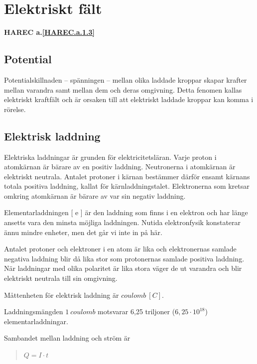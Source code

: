 \section{Elektriskt fält}
\textbf{HAREC a.\ref{HAREC.a.1.3}\label{myHAREC.a.1.3}}
\label{elektriskafält}

\subsection{Potential}

Potentialskillnaden -- spänningen -- mellan olika laddade kroppar skapar
krafter mellan varandra samt mellan dem och deras omgivning.
Detta fenomen kallas elektriskt kraftfält och är orsaken till att elektriskt
laddade kroppar kan komma i rörelse.

\subsection{Elektrisk laddning}

Elektriska laddningar är grunden för elektricitetsläran.
Varje proton i atomkärnan är bärare av en positiv laddning.
Neutronerna i atomkärnan är elektriskt neutrala.
Antalet protoner i kärnan bestämmer därför ensamt kärnans totala positiva
laddning, kallat för kärnladdningstalet.
Elektronerna som kretsar omkring atomkärnan är bärare av var sin negativ
laddning.

Elementarladdningen [ e ] är den laddning som finns i en elektron och har länge
ansetts vara den minsta möjliga laddningen.
Nutida elektronfysik konstaterar ännu mindre enheter, men det går vi inte in på
här.

Antalet protoner och elektroner i en atom är lika och elektronernas samlade
negativa laddning blir då lika stor som protonernas samlade positiva laddning.
När laddningar med olika polaritet är lika stora väger de ut varandra och blir
elektriskt neutrala till sin omgivning.

Måttenheten för elektrisk laddning är \(coulomb\ [C]\).

Laddningsmängden \(1\ coulomb\) motsvarar 6,25 triljoner (\(6,25\cdot10^{18}\))
elementarladdningar.

Sambandet mellan laddning och ström är

\begin{quote}
\(Q = I \cdot t\)
\end{quote}

